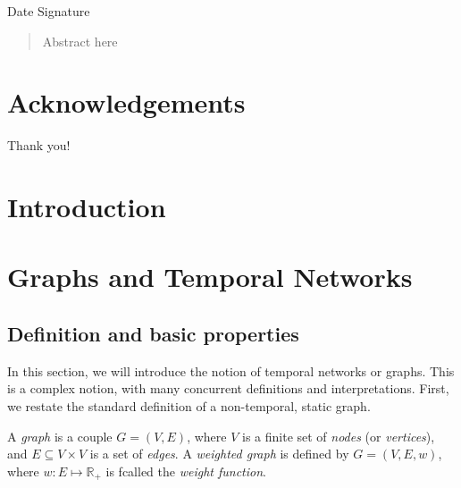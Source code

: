 \documentclass[a4paper,11pt,openany,extrafontsizes]{memoir}
\begin{document}
\begin{center}
  Date \hspace{.5\linewidth} Signature
\end{center}


\cleardoublepage%

\begin{abstract}
  Abstract here
\end{abstract}

\cleardoublepage%

\chapter*{Acknowledgements}%
\label{cha:acknowledgements}

Thank you!

\cleardoublepage%

\tableofcontents*
\listoffigures*
\listoftables*

\clearpage

\mainmatter%

\chapter{Introduction}%
\label{cha:introduction}


\chapter{Graphs and Temporal Networks}%
\label{cha:temporal-networks}

\section{Definition and basic properties}%
\label{sec:defin-basic-prop}

In this section, we will introduce the notion of temporal networks or
graphs. This is a complex notion, with many concurrent definitions and
interpretations. First, we restate the standard definition of a
non-temporal, static graph.

\begin{defn}[Graph]
  A \emph{graph} is a couple $G = (V, E)$, where $V$ is a finite set
  of \emph{nodes} (or \emph{vertices}), and $E \subseteq V\times V$ is
  a set of \emph{edges}. A \emph{weighted graph} is defined by
  $G = (V, E, w)$, where $w : E\mapsto \mathbb{R}_+$ is fcalled the
  \emph{weight function}.
\end{defn}
\end{document}
